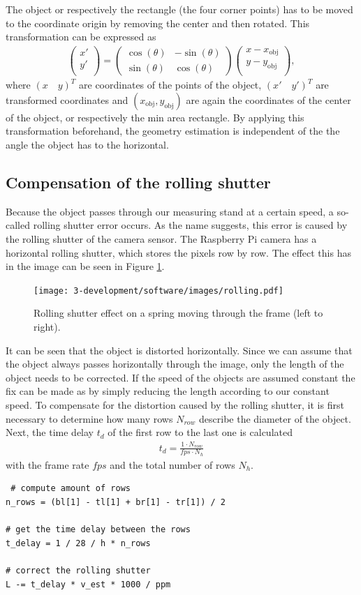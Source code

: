The object or respectively the rectangle (the four corner points) has to be moved to the coordinate origin by removing the center and then rotated.
This transformation can be expressed as
\begin{align*}
	\begin{pmatrix}
	x'\\
	y'\\
	\end{pmatrix}=
	\begin{pmatrix}
	\cos(\theta)&-\sin(\theta)\\
	\sin(\theta)&\cos(\theta)
	\end{pmatrix}
	\begin{pmatrix}
	x-x_{\text{obj}}\\
	y-y_{\text{obj}}\\
	\end{pmatrix},	
\end{align*}
where $(x\quad y)^T$ are coordinates of the points of the object, $(x'\quad y')^T$ are transformed coordinates and $(x_{\text{obj}}, y_{\text{obj}})$ are again the coordinates of the center of the object, or respectively the min area rectangle.
By applying this transformation beforehand, the geometry estimation is independent of the the angle the object has to the horizontal. 

\subsection{Compensation of the rolling shutter}
Because the object passes through our measuring stand at a certain speed, a so-called rolling shutter error occurs. 
As the name suggests, this error is caused by the rolling shutter of the camera sensor. 
The Raspberry Pi camera has a horizontal rolling shutter, which stores the pixels row by row.
The effect this has in the image can be seen in Figure \ref{development:rolling}.
\begin{figure}[ht]
	\centering
	\texttt{[image: 3-development/software/images/rolling.pdf]}
	\caption{Rolling shutter effect on a spring moving through the frame (left to right).\label{development:rolling}}
\end{figure}
It can be seen that the object is distorted horizontally.
Since we can assume that the object always passes horizontally through the image, only the length of the object needs to be corrected.
If the speed of the objects are assumed constant the fix can be made as by simply reducing the length according to our constant speed.
To compensate for the distortion caused by the rolling shutter, it is first necessary to determine how many rows $N_{row}$ describe the diameter of the object.
Next, the time delay $t_d$ of the first row to the last one is calculated 
\begin{align*}
t_d = \frac{1\cdot N_{row}}{fps \cdot N_h}
\end{align*}
with the frame rate $fps$ and the total number of rows $N_h$.

\begin{lstlisting}
 # compute amount of rows
n_rows = (bl[1] - tl[1] + br[1] - tr[1]) / 2

# get the time delay between the rows
t_delay = 1 / 28 / h * n_rows

# correct the rolling shutter
L -= t_delay * v_est * 1000 / ppm
\end{lstlisting} 

